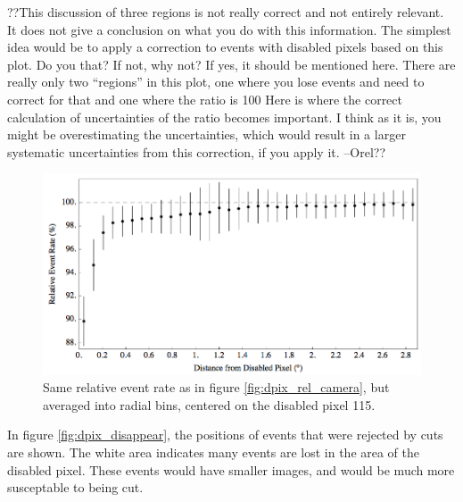     ??This discussion of three regions is not really correct and not entirely relevant.
    It does not give a conclusion on what you do with this information.
    The simplest idea would be to apply a correction to events with disabled pixels based on this plot. Do you that? If not, why not? If yes, it should be mentioned here.
    There are really only two “regions” in this plot, one where you lose events and need to correct for that and one where the ratio is 100%
    Here is where the correct calculation of uncertainties of the ratio becomes important.
    I think as it is, you might be overestimating the uncertainties, which would result in a larger systematic uncertainties from this correction, if you apply it. --Orel??


    \begin{figure}[ht]
      \begin{center}
        \includegraphics[width=\textwidth]{images/disabled_pixel/relativerate_radial}
        \caption[Radial Relative Event Rate]{Same relative event rate as in figure \ref{fig:dpix_rel_camera}, but averaged into radial bins, centered on the disabled pixel 115. }\label{fig:dpix_rel_radial}
      \end{center}
    \end{figure}

    In figure \ref{fig:dpix_disappear}, the positions of events that were rejected by cuts are shown.
    The white area indicates many events are lost in the area of the disabled pixel.
    These events would have smaller images, and would be much more susceptable to being cut.

